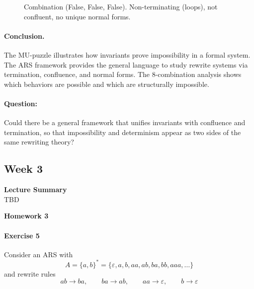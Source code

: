 \documentclass{article}
\theoremstyle{plain}
\theoremstyle{definition}
\theoremstyle{remark}
\begin{document}
\begin{figure}[H]
\centering
{}
\caption{Combination (False, False, False). Non-terminating (loops), not confluent, no unique normal forms.}
\label{fig:combo-fff}
\end{figure}

\FloatBarrier

\noindent\paragraph{Conclusion.}
The MU-puzzle illustrates how invariants prove impossibility in a formal system.
The ARS framework provides the general language to study rewrite systems via termination, confluence, and normal forms.
The 8-combination analysis shows which behaviors are possible and which are structurally impossible.

\noindent\paragraph{Question:}
Could there be a general framework that unifies invariants with confluence and termination, so that impossibility and determinism appear as two sides of the same rewriting theory?
\subsection{Week 3}
\textbf{Lecture Summary}
\\TBD

\textbf{Homework 3}
\paragraph{Exercise 5}

Consider an ARS with
\[
A = \{a,b\}^* = \{\varepsilon, a, b, aa, ab, ba, bb, aaa, \dots \}
\]
and rewrite rules
\[
ab \to ba, \qquad 
ba \to ab, \qquad 
aa \to \varepsilon, \qquad 
b \to \varepsilon
\]
\end{document}
